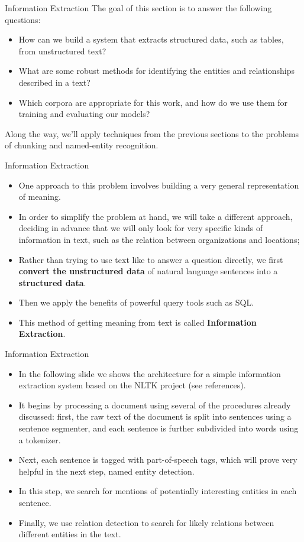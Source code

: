 \documentclass[11pt]{beamer}
\begin{document}
\begin{frame}{Information Extraction}
The goal of this section is to answer the following questions:
	\begin{itemize}
		\item How can we build a system that extracts structured data, such as tables, from unstructured text?
		\item What are some robust methods for identifying the entities and relationships described in a text?
		\item Which corpora are appropriate for this work, and how do we use them for training and evaluating our models?
	\end{itemize}
Along the way, we'll apply techniques from the previous sections to the problems of chunking and named-entity recognition.
\end{frame}
\begin{frame}{Information Extraction}
	\begin{itemize}
		\item One approach to this problem involves building a very general representation of meaning. 
		\item In order to simplify the problem at hand, we will take a different approach, deciding in advance that we will only look for very specific kinds of information in text, such as the relation between organizations and locations;
		\item Rather than trying to use text like to answer a question directly, we first \textbf{convert the unstructured data} of natural language sentences into a \textbf{structured data}. 
		\item Then we apply the benefits of powerful query tools such as SQL. 
		\item This method of getting meaning from text is called \textbf{Information Extraction}.
	\end{itemize}
\end{frame}
\begin{frame}{Information Extraction}
	\begin{itemize}
		\item In the following slide we shows the architecture for a simple information extraction system based on the NLTK project (see references). 
		\item It begins by processing a document using several of the procedures already discussed: first, the raw text of the document is split into sentences using a sentence segmenter, and each sentence is further subdivided into words using a tokenizer. 
		\item Next, each sentence is tagged with part-of-speech tags, which will prove very helpful in the next step, named entity detection. 
		\item In this step, we search for mentions of potentially interesting entities in each sentence. 
		\item Finally, we use relation detection to search for likely relations between different entities in the text.
	\end{itemize}
\end{frame}
\end{document}
